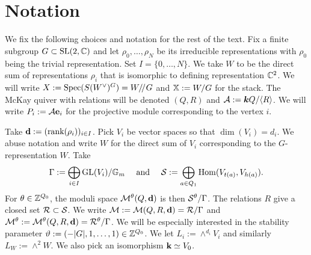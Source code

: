 \documentclass{amsart}
\theoremstyle{definition}
\begin{document}
\section*{Notation}
We fix the following choices and notation for the rest of the text.
Fix a finite subgroup $G \subset \operatorname{SL}(2,\mathbb{C})$ and let $\rho_0, \ldots, \rho_N$ be its
irreducible representations with $\rho_0$ being the trivial representation.
Set $I=\{0,\ldots,N\}$.
We take $W$ to be the direct sum of representations $\rho_i$ that is isomorphic to defining representation $\mathbb{C}^2$.
We will write $X:=\operatorname{Spec}(S(W^\vee)^G) = W / \! /_{} G$ and $\mathbb{X}:=W/G$ for the stack.
The McKay quiver with relations will be denoted $(Q,R)$ and $\mathcal{A}:= {\boldsymbol{k}} Q/ \langle R\rangle$.
We will write $P_i:= \mathcal{A}\mathbf{e}_i$ for the projective module corresponding to the vertex $i$.

Take $\mathbf{d}:=(\text{rank}(\rho_i))_{i \in I}$. 
Pick $V_i$ be vector spaces so that $\dim(V_i)=d_i$.
We abuse notation and write $W$ for the direct sum of $V_i$ corresponding to the $G$-representation $W$.
Take $$\Gamma:= \bigoplus_{i \in I} \text{GL}(V_i) / \mathbb{G}_m \quad \text{ and }\quad\mathcal{S}:=\bigoplus_{a \in Q_1} \operatorname{Hom}(V_{t(a)}, V_{h(a)}).$$
For $\theta \in \mathbb{Z}^{Q_0}$, the moduli space $\mathcal{M}^\theta(Q,\mathbf{d})$ is then $\mathcal{S}^\theta / \Gamma$.
The relations $R$ give a closed set $\mathcal{R} \subset \mathcal{S}$.
We write $\mathcal{M}:= \mathcal{M}(Q,R,\mathbf{d})=\mathcal{R}/\Gamma$ and $\mathcal{M}^\theta:=\mathcal{M}^\theta(Q,R,\mathbf{d})=\mathcal{R}^\theta/\Gamma$.
We will be especially interested in the stability parameter $\vartheta:= (-|G|,1, \ldots, 1) \in \mathbb{Z}^{Q_0}$.
We let $L_i:= \wedge^{d_i} V_i$ and similarly $L_W:= \wedge^2 W$.
We also pick an isomorphism $\mathbf{k} \simeq V_0$.
\end{document}
